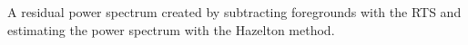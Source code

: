 A residual power spectrum created by subtracting foregrounds with the RTS and estimating the power spectrum with the Hazelton method.